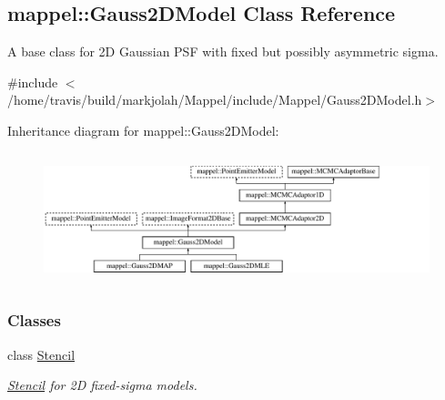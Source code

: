\hypertarget{classmappel_1_1Gauss2DModel}{}\subsection{mappel\+:\+:Gauss2\+D\+Model Class Reference}
\label{classmappel_1_1Gauss2DModel}


A base class for 2D Gaussian P\+SF with fixed but possibly asymmetric sigma.  




{\ttfamily \#include $<$/home/travis/build/markjolah/\+Mappel/include/\+Mappel/\+Gauss2\+D\+Model.\+h$>$}

Inheritance diagram for mappel\+:\+:Gauss2\+D\+Model\+:\begin{figure}[H]
\begin{center}
\leavevmode
\includegraphics[height=3.846154cm]{classmappel_1_1Gauss2DModel}
\end{center}
\end{figure}
\subsubsection*{Classes}
\begin{DoxyCompactItemize}
\item 
class \hyperlink{classmappel_1_1Gauss2DModel_1_1Stencil}{Stencil}
\begin{DoxyCompactList}\small\item\em \hyperlink{classmappel_1_1Gauss2DModel_1_1Stencil}{Stencil} for 2D fixed-\/sigma models. \end{DoxyCompactList}\end{DoxyCompactItemize}
